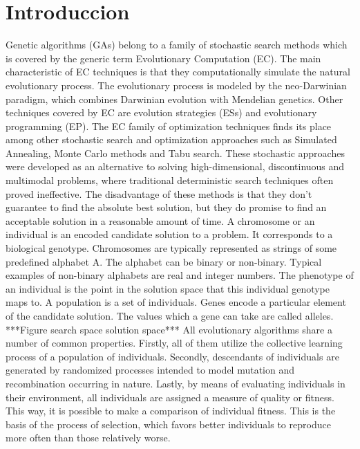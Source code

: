 %
%

\chapter[Introduccion]{
	Introduccion
}
Genetic algorithms (GAs) belong to a family of stochastic search methods which is covered by the generic term Evolutionary Computation (EC). The main characteristic of EC techniques is that they computationally simulate the natural evolutionary process. The evolutionary process is modeled by the neo-Darwinian paradigm, which combines Darwinian evolution with Mendelian genetics. Other techniques covered by EC are evolution strategies (ESs) and evolutionary programming (EP).
The EC family of optimization techniques finds its place among other stochastic search and optimization approaches such as Simulated Annealing, Monte Carlo methods and Tabu search. These stochastic approaches were developed as an alternative to solving high-dimensional, discontinuous and multimodal problems, where traditional deterministic search techniques often proved ineffective. The disadvantage of these methods is that they don't guarantee to find the absolute best solution, but they do promise to find an acceptable solution in a reasonable amount of time.
A chromosome or an individual is an encoded candidate solution to a problem. It corresponds to a biological genotype. Chromosomes are typically represented as strings of some predefined alphabet A. The alphabet can be binary or non-binary. Typical examples of non-binary alphabets are real and integer numbers. The phenotype of an individual is the point in the solution space that this individual genotype maps to. A population is a set of individuals. Genes encode a particular element of the candidate solution. The values which a gene can take are called alleles.
***Figure search space solution space***
All evolutionary algorithms share a number of common properties. Firstly, all of them utilize the collective learning process of a population of individuals. Secondly, descendants of individuals are generated by randomized processes intended to model mutation and recombination occurring in nature. Lastly, by means of evaluating individuals in their environment, all individuals are assigned a measure of quality or fitness. This way, it is possible to make a comparison of individual fitness. This is the basis of the process of selection, which favors better individuals to reproduce more often than those relatively worse.

